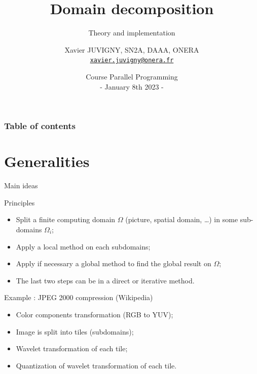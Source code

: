 \documentclass[compress,10pt,aspectratio=169]{beamer}
\title[Parallel programming\hspace{2em}]{Domain decomposition}
\subtitle{Theory and implementation}
\author[X. JUVIGNY]{Xavier JUVIGNY, SN2A, DAAA, ONERA\\ \href{mailto:xavier.juvigny@onera.fr}{\texttt{xavier.juvigny@onera.fr}} }
\date[01/08/2023]{Course Parallel Programming\\- January 8th 2023 -}
\institute{\inst{1}ONERA,\inst{2}DAAA}
\begin{document}
\MakeTitlePage

\begin{frame}
\frametitle{Table of contents}
\begin{multicols}{2}
\tableofcontents[hideallsubsections]
\end{multicols}
\end{frame}

\section{Generalities}

\begin{frame}[fragile]{Main ideas}
    \scriptsize

    \begin{block}{\small Principles}
        \begin{itemize}
            \item Split a finite computing domain $\Omega$ (picture, spatial domain, \dots) in some sub-domains $\Omega_{i}$;
            \item Apply a local method on each subdomains;
            \item Apply if necessary a global method to find the global result on $\Omega$;
            \item The last two steps can be in a direct or iterative method.
        \end{itemize}
    \end{block}

    \begin{exampleblock}{\small Example : JPEG 2000 compression (Wikipedia)}
        \begin{itemize}
            \item Color components transformation (RGB to YUV);
            \item Image is split into tiles (subdomains);
            \item Wavelet transformation of each tile;
            \item Quantization of wavelet transformation of each tile.
        \end{itemize}
    \end{exampleblock}
\end{frame}
\end{document}
